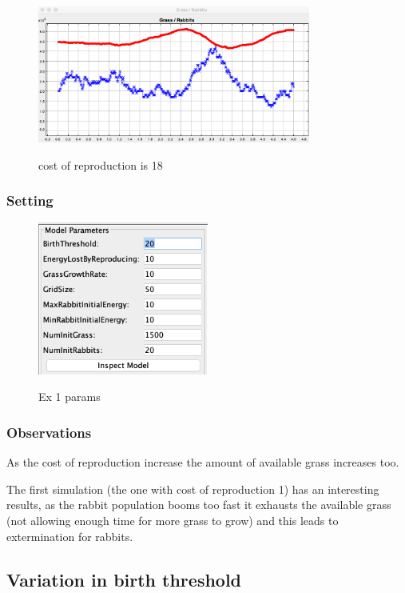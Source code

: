 \documentclass[11pt]{article}
\begin{document}
\begin{figure}[H]
\includegraphics[width=0.8\textwidth]{ex2-chart-18}
\centering
\label{fig:ex2-18}
\caption{ cost of reproduction is 18 }
\end{figure}

\subsubsection{Setting}
\begin{figure}[H]
\includegraphics[width=0.5\textwidth]{ex1-params}
\centering
\label{fig:movement-directions}
\caption{ Ex 1 params }
\end{figure}

\subsubsection{Observations}
As the cost of reproduction increase the amount of available grass increases too.

The first simulation (the one with cost of reproduction 1) has an interesting results, as the rabbit population booms too fast it exhausts the available grass (not allowing enough time for more grass to grow) and this leads to extermination for rabbits.



\subsection{Variation in birth threshold}
\end{document}

